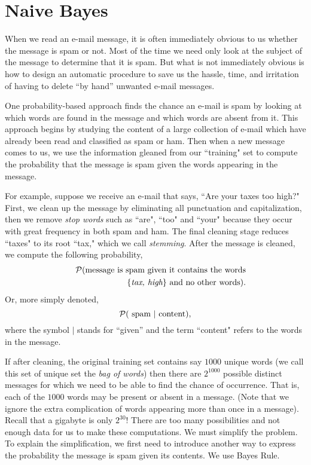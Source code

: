 \documentclass{article}
\begin{document}
\section{Naive Bayes}

When we read an e-mail message, it is often immediately obvious to
us whether the message is spam or not.  Most of the time we 
need only look at the subject of the message to determine
that it is spam.
But what is not immediately obvious is 
how to design an automatic procedure to save us the 
hassle, time, and irritation of having to delete ``by hand'' 
unwanted e-mail messages.

One probability-based approach finds the chance an e-mail is
spam by looking at which words are found in the message and 
which words are absent from it.
This approach begins by studying the content of a large collection of 
e-mail which have already been read and classified as spam or ham. 
Then when a new message comes to us, we use the information gleaned 
from our ``training" set to compute the probability that the
message is spam given the words appearing in the message.

For example, suppose we receive an e-mail that says, ``Are your taxes
too high?" 
First, we clean up the message by eliminating all punctuation and 
capitalization,
then we remove \textit{stop words} such as ``are", ``too" and ``your" because 
they occur with great frequency in both spam and ham.  The final cleaning
stage reduces ``taxes" to its root ``tax," which we call \textit{stemming}.
After the message is cleaned, we compute the following probability, 
\begin{eqnarray*}
 & ~ & {\cal P}(\textrm{message is spam given it contains the words}\\
 &~&    ~~~~~~~ \{ \textit{tax, high}\}
  \textrm{ and no other words} ).
\end{eqnarray*}
Or, more simply denoted,
$$ {\cal P}(\textrm{ spam } | \textrm{ content} ),$$
where the symbol $|$ stands for ``given'' and the term
``content" refers to the words in the message.

If after cleaning, the original training set contains say $1000$ unique 
words (we call this set of unique set the \textit{bag of words}) then
there are $2^{1000}$ possible distinct messages for which we need to be able 
to find the chance of occurrence.  
That is, each of the $1000$ words may be present
or absent in a message. (Note that we ignore the extra complication
of words appearing more than once in a message). 
Recall that a gigabyte is only $2^{30}$!
There are too many possibilities and not enough data for us to 
make these computations.  We must simplify the problem.
To explain the simplification, we first need to introduce
another way to express the probability the message is spam
given its contents. We use Bayes Rule.
\end{document}
